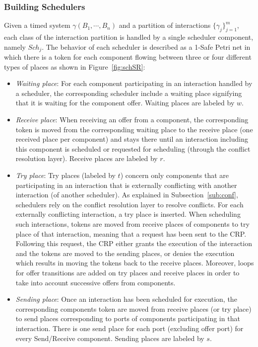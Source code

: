 \subsubsection{Building Schedulers}
  Given a timed system $\gamma(B_1,\cdots,B_n)$ and a partition of interactions 
  $\{\gamma_j\}^m_{j=1}$, each class of the interaction partition is handled by a single
  scheduler component, namely $Sch_j$.
  The behavior of each scheduler is described as a 1-Safe Petri net in which there is a token
  for each component flowing between three or four different types of places as shown
  in Figure~\ref{fig:schSR}:
  
  \begin{itemize}
    \item \emph{Waiting place}: For each component participating in an interaction handled by
      a scheduler, the corresponding scheduler include a waiting place signifying that 
      it is waiting for the component offer. Waiting places are labeled by $w$. 
    \item \emph{Receive place}: When receiving an offer from a component, the corresponding
      token is moved from the corresponding waiting place to the receive place (one received
      place per component) and stays there until an interaction including this component is 
      scheduled or requested for scheduling (through the conflict resolution layer). 
      Receive places are labeled by $r$.
    \item \emph{Try place}: Try places (labeled by $t$) 
      concern only components that are participating in an interaction that is externally
      conflicting with another interaction (of another scheduler). 
      As explained in Subsection~\ref{sub:conf}, schedulers
      rely on the conflict resolution layer to resolve conflicts. For each externally
      conflicting interaction, a try place is inserted. When scheduling such interactions,
      tokens are moved from receive places of components to try place of that interaction, 
      meaning that a request has been sent to the CRP. Following this request, the CRP 
      either grants the execution
      of the interaction and the tokens are moved to the sending places, or denies the execution
      which results in moving the tokens back to the receive places.
      Moreover, loops for offer transitions are added on try places and receive places
      in order to take into account successive offers from components. 
    \item \emph{Sending place}: Once an interaction has been scheduled for execution,
      the corresponding components token are moved from receive places (or try place) to
      send places corresponding to ports of components participating in that interaction. 
      There is one send place for each port (excluding offer port) 
      for every Send/Receive component.
      Sending places are labeled by $s$.
  \end{itemize}
